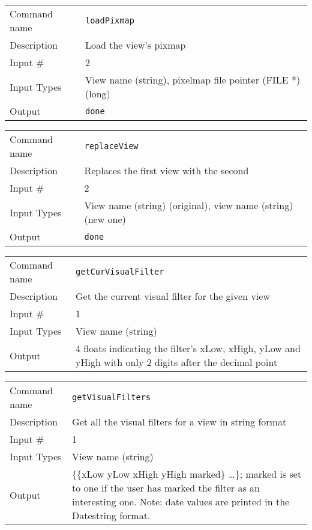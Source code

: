 \bigskip

\noindent
\begin{tabular}{l|p{5in}}
\hline
Command name & {\tt loadPixmap} \\
Description  & Load the view's pixmap \\
Input \#     & 2 \\
Input Types  & View name (string), pixelmap file pointer (FILE *) (long) \\
Output       & {\tt done} \\
\hline
\end{tabular}

\bigskip

\noindent
\begin{tabular}{l|p{5in}}
\hline
Command name & {\tt replaceView} \\
Description  & Replaces the first view with the second \\
Input \#     & 2 \\
Input Types  & View name (string) (original), view name (string) (new one) \\
Output       & {\tt done} \\
\hline
\end{tabular}

\bigskip

\noindent
\begin{tabular}{l|p{5in}}
\hline
Command name & {\tt getCurVisualFilter} \\
Description  & Get the current visual filter for the given view \\
Input \#     & 1 \\
Input Types  & View name (string) \\
Output       & 4 floats indicating the filter's xLow, xHigh, yLow and yHigh
               with only 2 digits after the decimal point \\
\hline
\end{tabular}

\bigskip

\noindent
\begin{tabular}{l|p{5in}}
\hline
Command name & {\tt getVisualFilters} \\
Description  & Get all the visual filters for a view in string format \\
Input \#     & 1 \\
Input Types  & View name (string) \\
Output       & \{\{xLow yLow xHigh yHigh marked\} \ldots \};
               marked is set to one if the user has marked the filter as
               an interesting one. Note: date values are printed in the
               Datestring format. \\
\hline
\end{tabular}

